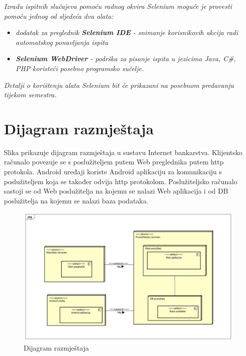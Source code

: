 			 \textit{Izradu ispitnih slučajeva pomoću radnog okvira Selenium moguće je provesti pomoću jednog od sljedeća dva alata:}
			 \begin{itemize}
			 	\item \textit{dodatak za preglednik \textbf{Selenium IDE} - snimanje korisnikovih akcija radi automatskog ponavljanja ispita	}
			 	\item \textit{\textbf{Selenium WebDriver} - podrška za pisanje ispita u jezicima Java, C\#, PHP koristeći posebno programsko sučelje.}
			 \end{itemize}
		 	\textit{Detalji o korištenju alata Selenium bit će prikazani na posebnom predavanju tijekom semestra.}
			
			\eject 
		
		
		\section{Dijagram razmještaja}
			
			Slika prikazuje dijagram razmještaja u sustavu Internet bankarstva. Klijentsko računalo povezuje se s poslužiteljem putem Web preglednika putem http protokola. Android uređaji koriste Android aplikaciju za komunikaciju s poslužiteljem koja se također odvija http protokolom. Poslužiteljsko računalo sastoji se od Web poslužitelja na kojemu se nalazi Web aplikacija i od DB poslužitelja na kojemu se nalazi baza podataka.
			
			\begin{figure}[H]
				\includegraphics[scale=0.3]{Slike/dijagram_razmjestaja.jpg}
				\centering
				\caption{Dijagram razmještaja}
				\label{fig:dijagram}
			\end{figure}
		
		\newpage
